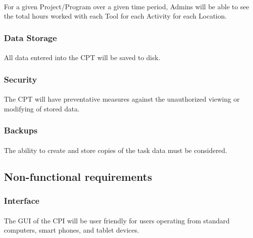 \documentclass[12pt]{article}
\begin{document}
\paragraph{} For a given Project/Program over a given time period, Admins will be able to see the total hours worked with each Tool for each Activity for each Location.
 
\subsubsection{Data Storage}\label{sec:Data Storage}
\paragraph{} All data entered into the CPT will be saved to disk.


\subsubsection{Security}\label{sec:Security}
\paragraph{} The CPT will have preventative measures against the unauthorized viewing or modifying of stored data.

\subsubsection{Backups}\label{sec:Backups}
\paragraph{} The ability to create and store copies of the task data must be considered.

\subsection{Non-functional requirements}
\subsubsection{Interface}\label{sec:Interface}
\paragraph{} The GUI of the CPI will be user friendly for users operating from standard computers, smart phones, and tablet devices.
\end{document}
